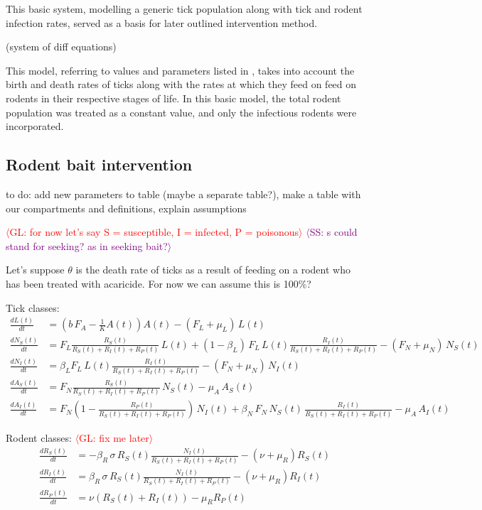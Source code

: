 \documentclass[12pt, centerh1]{article}
\newcommand{\sophie}[1]{{\textcolor{purple}{$\langle$SS: #1$\rangle$}}}
\newcommand{\geneva}[1]{{\textcolor{red}{$\langle$GL: #1$\rangle$}}}
\begin{document}
This basic system, modelling a generic tick population along with tick and rodent infection rates, served as a basis for later outlined intervention method.

(system of diff equations)

This model, referring to values and parameters listed in \citet{lou2014tick}, takes into account the birth and death rates of ticks along with the rates at which they feed on feed on rodents in their respective stages of life. In this basic model, the total rodent population was treated as a constant value, and only the infectious rodents were incorporated.

\subsection{Rodent bait intervention}

to do: add new parameters to table (maybe a separate table?), make a table with our compartments and definitions, explain assumptions

\geneva{for now let's say S = susceptible, I = infected, P = poisonous}
\sophie{s could stand for seeking? as in seeking bait?}

Let's suppose $\theta$ is the death rate of ticks as a result of feeding on a rodent who has been treated with acaricide. For now we can assume this is 100\%?

Tick classes:
\begin{align}
    \frac{dL(t)}{dt} &= \left(b \,F_A - \frac{1}{K} A(t)\right)A(t) - (F_L + \mu_L) \,L(t) \\
    \frac{dN_S(t)}{dt} &= F_L\frac{R_S(t)}{R_S(t) + R_I(t) + R_P(t)}\,L(t) + (1-\beta_L)\,F_L \,L(t) \frac{R_I(t)}{R_S(t) + R_I(t) + R_P(t)} - (F_N + \mu_N) \,N_S(t) \\
    \frac{dN_I(t)}{dt} &= \beta_L F_L \,L(t) \frac{R_I(t)}{R_S(t) + R_I(t) + R_P(t)} - (F_N + \mu_N) \,N_I(t) \\
    \frac{dA_S(t)}{dt} &= F_N\frac{R_S(t)}{R_S(t) + R_I(t) + R_P(t)}\,N_S(t) - \mu_A \,A_S(t) \\
    \frac{dA_I(t)}{dt} &= F_N\left(1-\frac{R_P(t)}{R_S(t) + R_I(t) + R_P(t)}\right)\,N_I(t) + \beta_N \,F_N \,N_S(t) \, \frac{R_I(t)}{R_S(t) + R_I(t) + R_P(t)} - \mu_A \,A_I(t)
\end{align}

Rodent classes: \geneva{fix me later}
\begin{align}
    \frac{dR_S(t)}{dt} &= -\beta_R \, \sigma \,R_S(t) \frac{N_I(t)}{R_S(t) + R_I(t) + R_P(t)} - (\nu + \mu_R) R_S(t) \\
    \frac{dR_I(t)}{dt} &= \beta_R \,\sigma \,R_S(t) \frac{N_I(t)}{R_S(t) + R_I(t) + R_P(t)} - (\nu + \mu_R) R_I(t) \\
    \frac{dR_P(t)}{dt} &= \nu (R_S(t) + R_I(t)) - \mu_R R_P(t)
\end{align}
\end{document}
